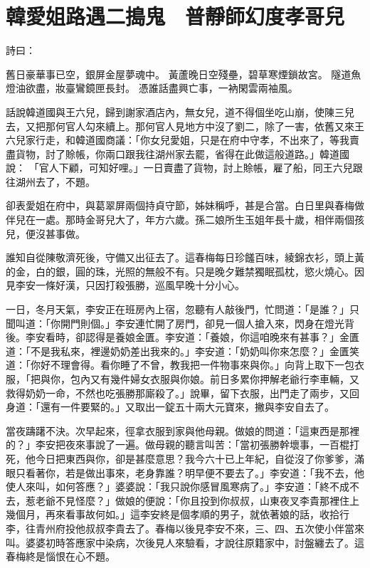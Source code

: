 %

\chapter{韓愛姐路遇二搗鬼　普靜師幻度孝哥兒}

詩曰：

舊日豪華事已空，銀屏金屋夢魂中。
黃蘆晚日空殘壘，碧草寒煙鎖故宮。
隧道魚燈油欲盡，妝臺鸞鏡匣長封。
憑誰話盡興亡事，一衲閑雲兩袖風。

話說韓道國與王六兒，歸到謝家酒店內，無女兒，道不得個坐吃山崩，使陳三兒去，又把那何官人勾來續上。那何官人見地方中沒了劉二，除了一害，依舊又來王六兒家行走，和韓道國商議：「你女兒愛姐，只是在府中守孝，不出來了，等我賣盡貨物，討了賒帳，你兩口跟我往湖州家去罷，省得在此做這般道路。」韓道國說： 「官人下顧，可知好哩。」一日賣盡了貨物，討上賒帳，雇了船，同王六兒跟往湖州去了，不題。

卻表愛姐在府中，與葛翠屏兩個持貞守節，姊妹稱呼，甚是合當。白日里與春梅做伴兒在一處。那時金哥兒大了，年方六歲。孫二娘所生玉姐年長十歲，相伴兩個孩兒，便沒甚事做。

誰知自從陳敬濟死後，守備又出征去了。這春梅每日珍饈百味，綾錦衣衫，頭上黃的金，白的銀，圓的珠，光照的無般不有。只是晚夕難禁獨眠孤枕，慾火燒心。因見李安一條好漢，只因打殺張勝，巡風早晚十分小心。

一日，冬月天氣，李安正在班房內上宿，忽聽有人敲後門，忙問道：「是誰？」只聞叫道：「你開門則個。」李安連忙開了房門，卻見一個人搶入來，閃身在燈光背後。李安看時，卻認得是養娘金匱。李安道：「養娘，你這咱晚來有甚事？」金匱道：「不是我私來，裡邊奶奶差出我來的。」李安道：「奶奶叫你來怎麼？」金匱笑道：「你好不理會得。看你睡了不曾，教我把一件物事來與你。」向背上取下一包衣服，「把與你，包內又有幾件婦女衣服與你娘。前日多累你押解老爺行李車輛，又救得奶奶一命，不然也吃張勝那廝殺了。」說畢，留下衣服，出門走了兩步，又回身道：「還有一件要緊的。」又取出一錠五十兩大元寶來，撇與李安自去了。

當夜躊躇不決。次早起來，徑拿衣服到家與他母親。做娘的問道：「這東西是那裡的？」李安把夜來事說了一遍。做母親的聽言叫苦：「當初張勝幹壞事，一百棍打死，他今日把東西與你，卻是甚麼意思？我今六十已上年紀，自從沒了你爹爹，滿眼只看著你，若是做出事來，老身靠誰？明早便不要去了。」李安道：「我不去，他使人來叫，如何答應？」婆婆說：「我只說你感冒風寒病了。」李安道：「終不成不去，惹老爺不見怪麼？」做娘的便說：「你且投到你叔叔，山東夜叉李貴那裡住上幾個月，再來看事故何如。」這李安終是個孝順的男子，就依著娘的話，收拾行李，往青州府投他叔叔李貴去了。春梅以後見李安不來，三、四、五次使小伴當來叫。婆婆初時答應家中染病，次後見人來驗看，才說往原籍家中，討盤纏去了。這春梅終是惱恨在心不題。

